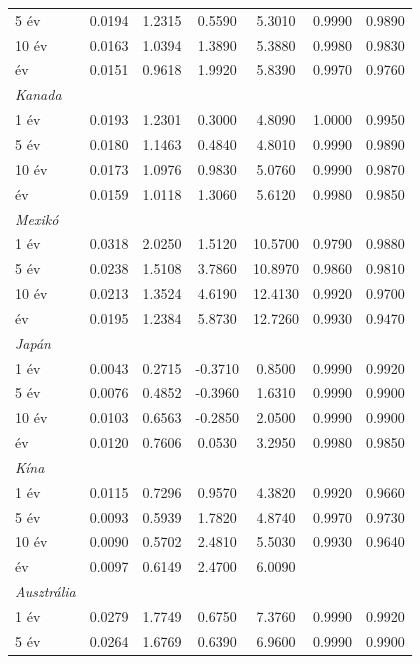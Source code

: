 \documentclass[12pt,bibliography=totoc]{article}
\begin{document}
\begin{appendices}
\begin{table}[H]
\begin{tabular}{l c c c c c c}
5 év	&	0.0194	&	1.2315	&	0.5590	&	5.3010	&	0.9990	&	0.9890	\\
10 év	&	0.0163	&	1.0394	&	1.3890	&	5.3880	&	0.9980	&	0.9830	\\
\medskip
30 év	&	0.0151	&	0.9618	&	1.9920	&	5.8390	&	0.9970	&	0.9760	\\
\textit{Kanada}	&		&		&		&		&		&		\\
1 év	&	0.0193	&	1.2301	&	0.3000	&	4.8090	&	1.0000	&	0.9950	\\
5 év	&	0.0180	&	1.1463	&	0.4840	&	4.8010	&	0.9990	&	0.9890	\\
10 év	&	0.0173	&	1.0976	&	0.9830	&	5.0760	&	0.9990	&	0.9870	\\
\medskip													
30 év	&	0.0159	&	1.0118	&	1.3060	&	5.6120	&	0.9980	&	0.9850	\\
\textit{Mexikó}	&		&		&		&		&		&		\\
1 év	&	0.0318	&	2.0250	&	1.5120	&	10.5700	&	0.9790	&	0.9880	\\
5 év	&	0.0238	&	1.5108	&	3.7860	&	10.8970	&	0.9860	&	0.9810	\\
10 év	&	0.0213	&	1.3524	&	4.6190	&	12.4130	&	0.9920	&	0.9700	\\
\medskip
30 év	&	0.0195	&	1.2384	&	5.8730	&	12.7260	&	0.9930	&	0.9470	\\
\textit{Japán}	&		&		&		&		&		&		\\
1 év	&	0.0043	&	0.2715	&	-0.3710	&	0.8500	&	0.9990	&	0.9920	\\
5 év	&	0.0076	&	0.4852	&	-0.3960	&	1.6310	&	0.9990	&	0.9900	\\
10 év	&	0.0103	&	0.6563	&	-0.2850	&	2.0500	&	0.9990	&	0.9900	\\
\medskip													
30 év	&	0.0120	&	0.7606	&	0.0530	&	3.2950	&	0.9980	&	0.9850	\\
\textit{Kína}	&		&		&		&		&		&		\\
1 év	&	0.0115	&	0.7296	&	0.9570	&	4.3820	&	0.9920	&	0.9660	\\
5 év	&	0.0093	&	0.5939	&	1.7820	&	4.8740	&	0.9970	&	0.9730	\\
10 év	&	0.0090	&	0.5702	&	2.4810	&	5.5030	&	0.9930	&	0.9640	\\
\medskip													
30 év	&	0.0097	&	0.6149	&	2.4700	&	6.0090	&		&		\\
\textit{Ausztrália}	&		&		&		&		&		&		\\
1 év	&	0.0279	&	1.7749	&	0.6750	&	7.3760	&	0.9990	&	0.9920	\\
5 év	&	0.0264	&	1.6769	&	0.6390	&	6.9600	&	0.9990	&	0.9900	\\

\end{tabular}
\end{table}
\end{appendices}
\end{document}

